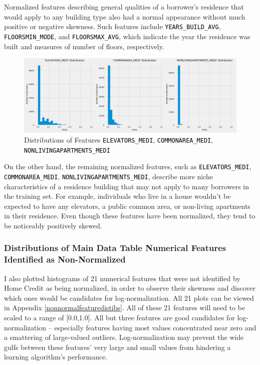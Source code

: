 \documentclass[12pt, letterpaper]{article}
\begin{document}
Normalized features describing general qualities of a borrower's residence that would apply to any building type also had a normal appearance without much positive or negative skewness. Such features include \colorbox{backcolor}{\textcolor{black}{\texttt{YEARS_BUILD_AVG}}}, \colorbox{backcolor}{\textcolor{black}{\texttt{FLOORSMIN_MODE}}}, and \colorbox{backcolor}{\textcolor{black}{\texttt{FLOORSMAX_AVG}}}, which indicate the year the residence was built and measures of number of floors, respectively.

\begin{figure}[ht]
\includegraphics[width=\textwidth]{distribsELEVATORSMEDICOMMONAREAMEDINONLIVINGAPARTMENTSMED}
\centering
\caption{Distributions of Features \colorbox{backcolor}{\textcolor{black}{\texttt{ELEVATORS_MEDI}}}, \colorbox{backcolor}{\textcolor{black}{\texttt{COMMONAREA_MEDI}}}, \colorbox{backcolor}{\textcolor{black}{\texttt{NONLIVINGAPARTMENTS_MEDI}}}}
\end{figure}

On the other hand, the remaining normalized features, such as \colorbox{backcolor}{\textcolor{black}{\texttt{ELEVATORS_MEDI}}}, \colorbox{backcolor}{\textcolor{black}{\texttt{COMMONAREA_MEDI}}}, \colorbox{backcolor}{\textcolor{black}{\texttt{NONLIVINGAPARTMENTS_MEDI}}}, describe more niche characteristics of a residence building that may not apply to many borrowers in the training set. For example, individuals who live in a house wouldn't be expected to have any elevators, a public common area, or non-living apartments in their residence. Even though these features have been normalized, they tend to be noticeably positively skewed.

\subsubsection{Distributions of Main Data Table Numerical Features Identified as Non-Normalized}
I also plotted histograms of 21 numerical features that were not identified by Home Credit as being normalized, in order to observe their skewness and discover which ones would be candidates for log-normalization. All 21 plots can be viewed in Appendix \ref{nonnormalfeaturedistibs}. All of these 21 features will need to be scaled to a range of [0.0,1.0]. All but three features are good candidates for log-normalization -- especially features having most values concentrated near zero and a smattering of large-valued outliers. Log-normalization may prevent the wide gulfs between these features' very large and small values from hindering a learning algorithm's performance.
\end{document}

